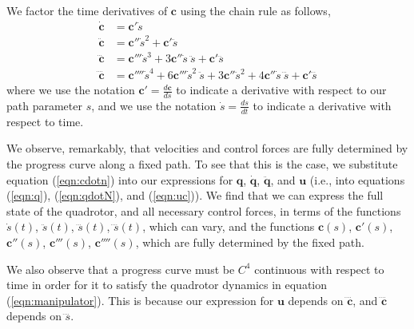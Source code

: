 We factor the time derivatives of $\mathbf{c}$ using the chain rule as follows,
%
%
%
\begin{equation}
\begin{aligned}
\dot{\mathbf{c}}    & = \mathbf{c}' \dot{s} \\
\ddot{\mathbf{c}}   & = \mathbf{c}''   \dot{s}^2 +   \mathbf{c}'   \ddot{s} \\
\dddot{\mathbf{c}}  & = \mathbf{c}'''  \dot{s}^3 + 3 \mathbf{c}''  \dot{s}   ~\ddot{s} +   \mathbf{c}'  \dddot{s} \\
\ddddot{\mathbf{c}} & = \mathbf{c}'''' \dot{s}^4 + 6 \mathbf{c}''' \dot{s}^2 ~\ddot{s} + 3 \mathbf{c}'' \ddot{s}^2 + 4 \mathbf{c}'' \dot{s}~\dddot{s} + \mathbf{c}' \ddddot{s}
\end{aligned}
\label{eqn:cdotn}
\end{equation}
%
where we use the notation $\mathbf{c}' = \frac{d \mathbf{c}}{d s}$ to indicate a derivative with respect to our path parameter $s$, and we use the notation $\dot{s} = \frac{d s}{d t}$ to indicate a derivative with respect to time.

We observe, remarkably, that velocities and control forces are fully determined by the progress curve along a fixed path.
To see that this is the case, we substitute equation (\ref{eqn:cdotn}) into our expressions for $\mathbf{q}$, $\dot{\mathbf{q}}$, $\ddot{\mathbf{q}}$, and $\mathbf{u}$ (i.e., into equations (\ref{eqn:q}), (\ref{eqn:qdotN}), and (\ref{eqn:uc})).
We find that we can express the full state of the quadrotor, and all necessary control forces, in terms of the functions  $\dot{s}(t)$, $\ddot{s}(t)$, $\dddot{s}(t)$, $\ddddot{s}(t)$, which can vary, and the functions $\mathbf{c}(s)$, $\mathbf{c}'(s)$, $\mathbf{c}''(s)$, $\mathbf{c}'''(s)$, $\mathbf{c}''''(s)$, which are fully determined by the fixed path.

We also observe that a progress curve must be $C^4$ continuous with respect to time in order for it to satisfy the quadrotor dynamics in equation (\ref{eqn:manipulator}).
This is because our expression for $\mathbf{u}$ depends on $\ddddot{\mathbf{c}}$, and $\ddddot{\mathbf{c}}$ depends on $\ddddot{s}$.

